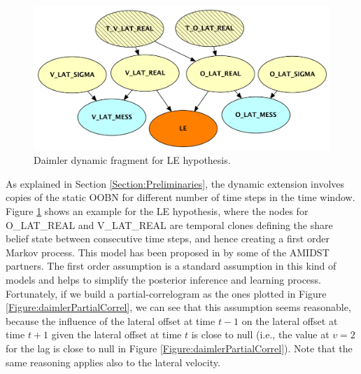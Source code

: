 \begin{figure}
\begin{center}
\includegraphics[scale=0.58]{./figures/DaimlerLEdyn}
\end{center}
\caption{\label{Figure:daimlerLEdyn}Daimler dynamic fragment for LE hypothesis.}
\end{figure}

As explained in Section \ref{Section:Preliminaries}, the dynamic extension involves copies of the static OOBN for different number of time steps in the time window. Figure \ref{Figure:daimlerLEdyn} shows an example for the LE hypothesis, where the nodes for O\_LAT\_REAL and V\_LAT\_REAL are temporal clones defining the share belief state between consecutive time steps, and hence creating a first order Markov process. This model has been proposed in \cite{Weidl2014} by some of the AMIDST partners. The first order assumption is a standard assumption in this kind of models and helps to simplify the posterior inference and learning process. Fortunately, if we build a partial-correlogram as the ones plotted in Figure \ref{Figure:daimlerPartialCorrel}, we can see that this assumption seems reasonable, because the influence of the lateral offset at time $t-1$ on the lateral offset at time $t+1$ given the lateral offset at time $t$ is close to null (i.e., the value at $v=2$ for the lag is close to null in Figure \ref{Figure:daimlerPartialCorrel}). Note that the same reasoning applies also to the lateral velocity.

